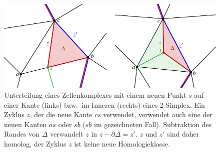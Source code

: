 %
%
%
\begin{figure}
\centering
\includegraphics{chapters/120-topologie/images/unterzyklen.pdf}
\caption{Unterteilung eines Zellenkomplexes mit einem neuen Punkt $s$
auf einer Kante (links) bzw.~im Inneren (rechts) eines 2-Simplex.
Ein Zyklus $z$, der die neue Kante $cs$ verwendet, verwendet auch eine der
neuen Kanten $as$ oder $sb$ ($sb$ im gezeichneten Fall).
Subtraktion des Randes von $\Delta$ verwandelt $z$ in $z-\partial\Delta = z'$.
$z$ und $z'$ sind daher homolog, der Zyklus $z$ ist keine neue
Homologieklasse.
\label{buch:topologie:simplex:fig:unterzyklen}}
\end{figure}

